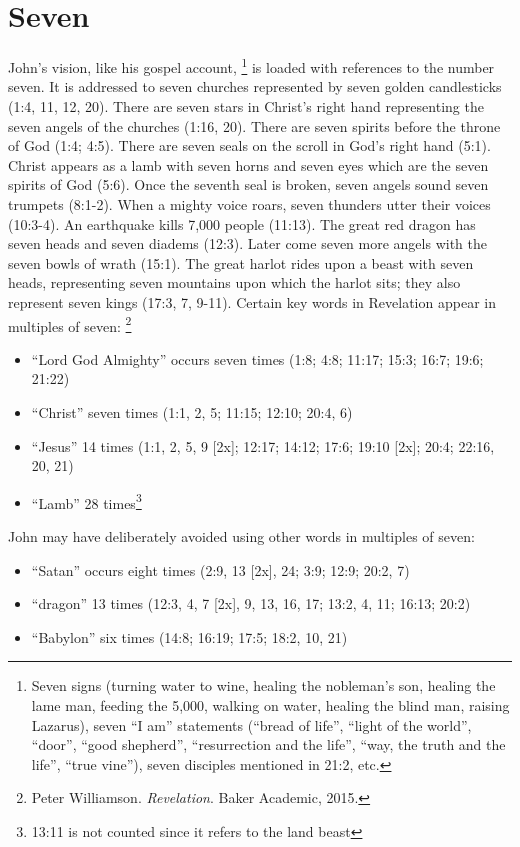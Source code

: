 \section*{Seven}
John's vision, like his gospel account,%
	\footnote{Seven signs (turning water to wine, healing the nobleman's son, healing the lame man, feeding the 5,000, walking on water, healing the blind man, raising Lazarus), seven ``I am'' statements (``bread of life'', ``light of the world'', ``door'', ``good shepherd'', ``resurrection and the life'', ``way, the truth and the life'', ``true vine''), seven disciples mentioned in 21:2, etc.} %
is loaded with references to the number seven. It is addressed to seven churches represented by seven golden candlesticks (1:4, 11, 12, 20). There are seven stars in Christ's right hand representing the seven angels of the churches (1:16, 20). There are seven spirits before the throne of God (1:4; 4:5). There are seven seals on the scroll in God's right hand (5:1). Christ appears as a lamb with seven horns and seven eyes which are the seven spirits of God (5:6). Once the seventh seal is broken, seven angels sound seven trumpets (8:1-2). When a mighty voice roars, seven thunders utter their voices (10:3-4). An earthquake kills 7,000 people (11:13). The great red dragon has seven heads and seven diadems (12:3). Later come seven more angels with the seven bowls of wrath (15:1). The great harlot rides upon a beast with seven heads, representing seven mountains upon which the harlot sits; they also represent seven kings (17:3, 7, 9-11). 
\newline\newline
Certain key words in Revelation appear in multiples of seven:%
	\footnote{Peter Williamson. \textit{Revelation}. Baker Academic, 2015.} %
\begin{itemize}
 \item ``Lord God Almighty'' occurs seven times (1:8; 4:8; 11:17; 15:3; 16:7; 19:6; 21:22)
 \item ``Christ'' seven times (1:1, 2, 5; 11:15; 12:10; 20:4, 6)
 \item ``Jesus'' 14 times (1:1, 2, 5, 9 [2x]; 12:17; 14:12; 17:6; 19:10 [2x]; 20:4; 22:16, 20, 21)
 \item ``Lamb''  28 times\footnote{13:11 is not counted since it refers to the land beast}
\end{itemize}
John may have deliberately avoided using other words in multiples of seven:
\begin{itemize}
\item ``Satan'' occurs eight times (2:9, 13 [2x], 24; 3:9; 12:9; 20:2, 7)
\item ``dragon'' 13 times (12:3, 4, 7 [2x], 9, 13, 16, 17; 13:2, 4, 11; 16:13; 20:2)
\item ``Babylon'' six times (14:8; 16:19; 17:5; 18:2, 10, 21)
\end{itemize}
